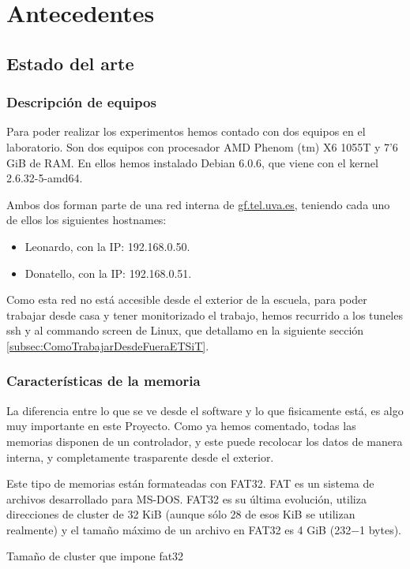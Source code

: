 \chapter{Antecedentes}
\section{Estado del arte}

\subsection{Descripción de equipos}
Para poder realizar los experimentos hemos contado con dos equipos en el laboratorio. Son dos equipos con procesador AMD Phenom (tm) X6 1055T y 7'6 GiB de RAM. En ellos hemos instalado Debian 6.0.6, que viene con el kernel 2.6.32-5-amd64.

Ambos dos forman parte de una red interna de \url{gf.tel.uva.es}, teniendo cada uno de ellos los siguientes hostnames:
\setlength{\parskip}{0mm}
\begin{itemize}
\item Leonardo, con la IP: 192.168.0.50.
\item Donatello, con la IP: 192.168.0.51.
\end{itemize}
\setlength{\parskip}{4mm}

Como esta red no está accesible desde el exterior de la escuela, para poder trabajar desde casa y tener monitorizado el trabajo, hemos recurrido a los tuneles ssh y al commando screen de Linux, que detallamo en la siguiente sección \ref{subsec:ComoTrabajarDesdeFueraETSiT}.

\subsection{Características de la memoria}

La diferencia entre lo que se ve desde el software y lo que fisicamente está, es algo muy importante en este Proyecto. Como ya hemos comentado, todas las memorias disponen de un controlador, y este puede recolocar los datos de manera interna, y completamente trasparente desde el exterior.

Este tipo de memorias están formateadas con FAT32. FAT es un sistema de archivos desarrollado para MS-DOS. FAT32 es su última evolución, utiliza direcciones de cluster de 32 KiB (aunque sólo 28 de esos KiB se utilizan realmente) y el tamaño máximo de un archivo en FAT32 es 4 GiB (232−1 bytes).

Tamaño de cluster que impone fat32 \cite{fat32_1} \cite{fat32_2}

